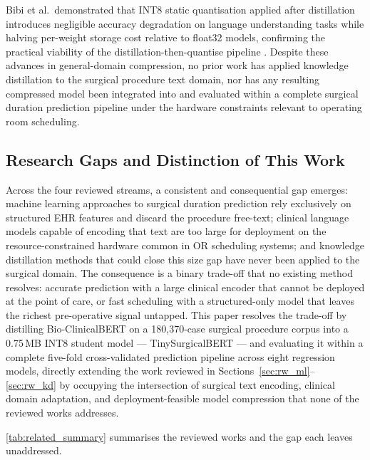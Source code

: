 Bibi et al.\ demonstrated that INT8 static quantisation applied after distillation introduces negligible accuracy degradation on language understanding tasks while halving per-weight storage cost relative to float32 models, confirming the practical viability of the distillation-then-quantise pipeline \cite{bibi2024advances}. Despite these advances in general-domain compression, no prior work has applied knowledge distillation to the surgical procedure text domain, nor has any resulting compressed model been integrated into and evaluated within a complete surgical duration prediction pipeline under the hardware constraints relevant to operating room scheduling.

\subsection*{Research Gaps and Distinction of This Work}

Across the four reviewed streams, a consistent and consequential gap emerges: machine learning approaches to surgical duration prediction rely exclusively on structured EHR features and discard the procedure free-text; clinical language models capable of encoding that text are too large for deployment on the resource-constrained hardware common in OR scheduling systems; and knowledge distillation methods that could close this size gap have never been applied to the surgical domain. The consequence is a binary trade-off that no existing method resolves: accurate prediction with a large clinical encoder that cannot be deployed at the point of care, or fast scheduling with a structured-only model that leaves the richest pre-operative signal untapped. This paper resolves the trade-off by distilling Bio-ClinicalBERT on a 180{,}370-case surgical procedure corpus into a 0.75\,MB INT8 student model — TinySurgicalBERT — and evaluating it within a complete five-fold cross-validated prediction pipeline across eight regression models, directly extending the work reviewed in Sections~\ref{sec:rw_ml}--\ref{sec:rw_kd} by occupying the intersection of surgical text encoding, clinical domain adaptation, and deployment-feasible model compression that none of the reviewed works addresses.

\cref{tab:related_summary} summarises the reviewed works and the gap each leaves unaddressed.

